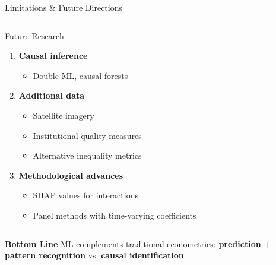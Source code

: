 \documentclass[aspectratio=169,8pt]{beamer}
\begin{document}
\begin{frame}{Limitations \& Future Directions}
\begin{columns}[totalwidth=\textwidth,T]
            \begin{exampleblock}{Future Research}
            \begin{enumerate}
                \item \textbf{Causal inference}
                \begin{itemize}
                    \item Double ML, causal forests
                \end{itemize}
                \item \textbf{Additional data}
                \begin{itemize}
                    \item Satellite imagery
                    \item Institutional quality measures
                    \item Alternative inequality metrics
                \end{itemize}
                \item \textbf{Methodological advances}
                \begin{itemize}
                    \item SHAP values for interactions
                    \item Panel methods with time-varying coefficients
                \end{itemize}
            \end{enumerate}
            \end{exampleblock}
        \end{columns}

        \vspace{0.2cm}
        \begin{columns}[totalwidth=\textwidth,T]
            \column{\textwidth}
            \begin{alertblock}{\textbf{Bottom Line}}
                ML complements traditional econometrics: \textbf{prediction + pattern recognition} vs. \textbf{causal identification}
            \end{alertblock}
        \end{columns}
    \end{frame}
\end{document}
